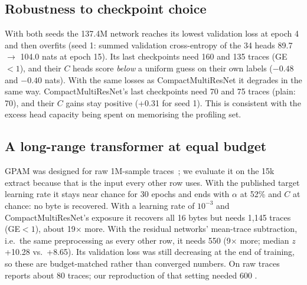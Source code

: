 \subsection{Robustness to checkpoint choice}
With both seeds the 137.4M network reaches its lowest validation loss at epoch 4 and then overfits
(seed 1: summed validation cross-entropy of the 34 heads 89.7 $\to$ 104.0 nats at epoch 15). Its last checkpoints need 160 and 135 traces (GE$<1$), and
their $C$ heads score \emph{below} a uniform guess on their own labels ($-0.48$ and $-0.40$ nats). With the same losses as
CompactMultiResNet it degrades in the same way. CompactMultiResNet's last checkpoints need 70 and 75
traces (plain: 70), and their $C$ gains stay positive (+0.31 for seed 1). This is consistent with the
excess head capacity being spent on memorising the profiling set.


\subsection{A long-range transformer at equal budget}
GPAM was designed for raw 1M-sample traces~\cite{GPAM}; we evaluate it on the 15k extract because
that is the input every other row uses. With the published target learning rate it stays near chance
for 30 epochs and ends with $\alpha$ at 52\% and $C$ at chance: no byte is recovered. With a learning
rate of $10^{-3}$ and CompactMultiResNet's exposure it recovers all 16 bytes but needs 1,145 traces
(GE$<1$), about 19$\times$ more. With the residual networks' mean-trace subtraction, i.e.\ the
same preprocessing as every other row, it needs 550 (9$\times$ more; median $z$ +10.28 vs.\
+8.65). Its validation loss was
still decreasing at the end of training, so these are budget-matched rather than converged numbers.
On raw traces~\cite{GPAM} reports about 80 traces; our reproduction of that setting needed 600
\todo{cite T-019 protocol in appendix}.

